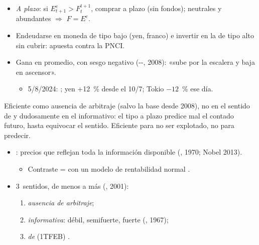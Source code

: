 \documentclass{article}
\begin{document}
\begin{columnas}
\begin{itemize}
\item \emph{A plazo}: si $E^e_{t+1}>F_t^{t+1}$, comprar a plazo (sin fondos); neutrales y abundantes $\Rightarrow$ $F=E^e$.
\end{itemize}
\begin{itemize}
\item Endeudarse en moneda de tipo bajo (yen, franco) e invertir en la de tipo alto sin cubrir: apuesta contra la PNCI.
\item Gana en promedio, con sesgo negativo (--, 2008): «sube por la escalera y baja en ascensor».
  \begin{itemize}
  \item 5/8/2024: ; yen +12~\% desde el 10/7; Tokio $-12$~\% ese día.
  \end{itemize}
\end{itemize}

\begin{ideaclave}
Eficiente como ausencia de arbitraje (salvo la base desde 2008), no en el sentido de  y dudosamente en el informativo: el tipo a plazo predice mal el contado futuro, hasta equivocar el sentido. Eficiente para no ser explotado, no para predecir.
\end{ideaclave}

\begin{itemize}
\item {}: precios que reflejan toda la información disponible (, 1970; Nobel 2013).
  \begin{itemize}
  \item Contraste =  con un modelo de rentabilidad normal .
  \end{itemize}
\item 3~sentidos, de menos a más (, 2001):
  \begin{enumerate}
  \item \emph{ausencia de arbitraje};
  \item \emph{informativa}: débil, semifuerte, fuerte (, 1967);
  \item \emph{de } (1TFEB) .
  \end{enumerate}
\end{itemize}


\end{columnas}
\end{document}
